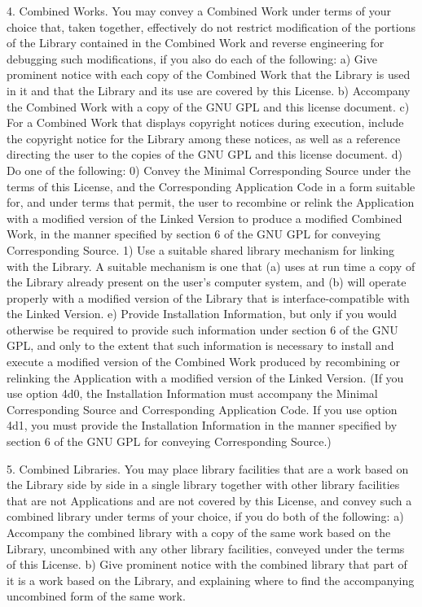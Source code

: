 \documentclass {scrbook}
\begin{document}
\begin{tiny}
4. Combined Works. You may convey a Combined Work under terms of your choice that, taken together, effectively do not restrict modification of the portions of the Library contained in the Combined Work and reverse engineering for debugging such modifications, if you also do each of the following: a) Give prominent notice with each copy of the Combined Work that the Library is used in it and that the Library and its use are covered by this License. b) Accompany the Combined Work with a copy of the GNU GPL and this license document. c) For a Combined Work that displays copyright notices during execution, include the copyright notice for the Library among these notices, as well as a reference directing the user to the copies of the GNU GPL and this license document. d) Do one of the following: 0) Convey the Minimal Corresponding Source under the terms of this License, and the Corresponding Application Code in a form suitable for, and under terms that permit, the user to recombine or relink the Application with a modified version of the Linked Version to produce a modified Combined Work, in the manner specified by section 6 of the GNU GPL for conveying Corresponding Source. 1) Use a suitable shared library mechanism for linking with the Library. A suitable mechanism is one that (a) uses at run time a copy of the Library already present on the user's computer system, and (b) will operate properly with a modified version of the Library that is interface-compatible with the Linked Version. e) Provide Installation Information, but only if you would otherwise be required to provide such information under section 6 of the GNU GPL, and only to the extent that such information is necessary to install and execute a modified version of the Combined Work produced by recombining or relinking the Application with a modified version of the Linked Version. (If you use option 4d0, the Installation Information must accompany the Minimal Corresponding Source and Corresponding Application Code. If you use option 4d1, you must provide the Installation Information in the manner specified by section 6 of the GNU GPL for conveying Corresponding Source.)

5. Combined Libraries. You may place library facilities that are a work based on the Library side by side in a single library together with other library facilities that are not Applications and are not covered by this License, and convey such a combined library under terms of your choice, if you do both of the following: a) Accompany the combined library with a copy of the same work based on the Library, uncombined with any other library facilities, conveyed under the terms of this License. b) Give prominent notice with the combined library that part of it is a work based on the Library, and explaining where to find the accompanying uncombined form of the same work.


\end{tiny}
\end{document}
